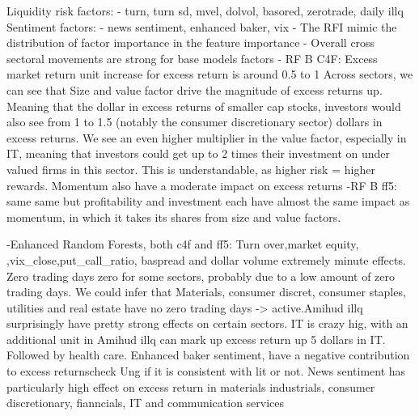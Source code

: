\begin{landscape}




\end{landscape}

Liquidity risk factors:
- turn, turn sd, mvel, dolvol, basored, zerotrade, daily illq
Sentiment factors:
- news sentiment, enhanced baker, vix
- The RFI mimic the distribution of factor importance in the feature importance
- Overall cross sectoral movements are strong for base models factors
- RF B C4F: Excess market return unit increase for excess return is around 0.5 to 1 Across sectors, we can see that Size and value factor drive the magnitude of excess returns up. Meaning that the dollar in excess returns of smaller cap stocks, investors would also see from 1 to 1.5 (notably the consumer discretionary sector) dollars in excess returns. We see an even higher multiplier in the value factor, especially in IT, meaning that investors could get up to 2 times their investment on under valued firms in this sector. This is understandable, as higher risk = higher rewards. Momentum also have a moderate impact on excess returns
-RF B ff5: same same but profitability and investment each have almost the same impact as momentum, in which it takes its shares from size and value factors.

-Enhanced Random Forests, both c4f and ff5: Turn over,market equity, ,vix_close,put_call_ratio, baspread and dollar volume extremely minute effects. Zero trading days zero for some sectors, probably due to a low amount of zero trading days. We could infer that Materials, consumer discret, consumer staples, utilities and real estate have no zero trading days -> active.Amihud illq surprisingly have pretty strong effects on certain sectors. IT is crazy hig, with an additional unit in Amihud illq can mark up excess return up 5 dollars in IT. Followed by health care. Enhanced baker sentiment, have a negative contribution to excess returns{check Ung if it is consistent with lit or not}. News sentiment has particularly high effect on excess return in materials industrials, consumer discretionary, fianncials, IT and communication services

